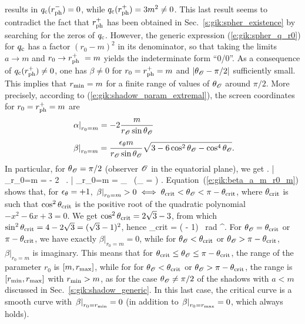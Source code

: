 results in $q_{\rm c}(r_{\rm ph}^-) = 0$, while $q_{\rm c}(r_{\rm ph}^+) = 3 m^2 \neq 0$.
This last result seems to contradict the fact that
$r_{\rm ph}^+$ has been
obtained in Sec.~\ref{s:gik:spher_existence} by searching for the zeros of $q_{\rm c}$.
However, the generic expression (\ref{e:gik:spher_q_r0}) for $q_{\rm c}$ has a factor $(r_0 - m)^2$
in its denominator, so that taking the limits $a\to m$ and $r_0\to r_{\rm ph}^+\ =  m$
yields the indeterminate form ``0/0''. As a consequence of $q_{\rm c}(r_{\rm ph}^+) \neq 0$,
one has $\beta\neq 0$ for $r_0 = r_{\rm ph}^+ = m$ and $|\theta_{\mathscr{O}} - \pi/2|$ sufficiently small.
This implies that $r_{\rm min} = m$ for a finite range of values of $\theta_{\mathscr{O}}$ around
$\pi/2$.
More precisely,
according to (\ref{e:gik:shadow_param_extremal}), the screen coordinates for $r_0 = r_{\rm ph}^+ = m$ are
\begin{subequations}
\label{e:gik:shadow_extremal_term}
\begin{align}
& \left. \alpha \right| _{r_0=m} =  - 2 \frac{m}{r_{\mathscr{O}}\sin\theta_{\mathscr{O}}}  \\[1ex]
& \left. \beta \right| _{r_0=m} = \frac{\epsilon_\theta m}{r_{\mathscr{O}} \sin\theta_{\mathscr{O}}}
        \sqrt{ 3 - 6 \cos^2\theta_{\mathscr{O}} - \cos^4\theta_{\mathscr{O}}} .  \label{e:gik:beta_a_m_r0_m}
\end{align}
\end{subequations}
In particular, for $\theta_{\mathscr{O}}=\pi/2$ (observer $\mathscr{O}$ in the equatorial plane), we get
\be \label{e:gik:shadow_extremal_term_equat}
    \left. \alpha \right| _{r_0=m}  = - 2 \, 
    \qand
    \left. \beta \right| _{r_0=m} = \eps_\th {} \,  \qquad
    \left(\th_{\Obs} =  \right) .
\ee
Equation~(\ref{e:gik:beta_a_m_r0_m}) shows that, for $\epsilon_\theta = +1$,
$\left. \beta \right| _{r_0=m} > 0 \iff \theta_{\rm crit} < \theta_{\mathscr{O}} < \pi - \theta_{\rm crit}$,
where $\theta_{\rm crit}$ is such that $\cos^2\theta_{\rm crit}$ is
the positive root of the quadratic polynomial $-x^2 - 6 x + 3 = 0$. We get
$\cos^2\theta_{\rm crit} = 2\sqrt{3} - 3$, from which $\sin^2\theta_{\rm crit} = 4 - 2\sqrt{3} = (\sqrt{3} - 1)^2$, hence
\be \label{e:gik:shadow_a1_th_crit}
    \th_{\rm crit} = \arcsin( - 1) \, {\rm rad} ^\circ .
\ee
For $\theta_{\mathscr{O}} = \theta_{\rm crit}$ or $\pi - \theta_{\rm crit}$, we have exactly $\left. \beta \right| _{r_0=m} = 0$,
while for $\theta_{\mathscr{O}} < \theta_{\rm crit}$ or $\theta_{\mathscr{O}} > \pi -  \theta_{\rm crit}$,
$\left. \beta \right| _{r_0=m}$ is imaginary. This means that
for $\theta_{\rm crit} \leq \theta_{\mathscr{O}} \leq \pi - \theta_{\rm crit}$, the range of the parameter $r_0$ is
$[m, r_{\rm max}]$, while for
for $\theta_{\mathscr{O}} < \theta_{\rm crit}$ or $\theta_{\mathscr{O}} > \pi -  \theta_{\rm crit}$,
the range is $[r_{\rm min}, r_{\rm max}]$ with $r_{\rm min} > m$, as for the case $\theta_{\mathscr{O}} \neq \pi/2$ of the shadows with $a < m$ discussed in Sec.~\ref{s:gik:shadow_generic}. In this last case,
the critical curve is a smooth curve with $\left. \beta \right| _{r_0=r_{\rm min}} = 0$ (in addition
to $\left. \beta \right| _{r_0=r_{\rm max}} = 0$, which always holds).

